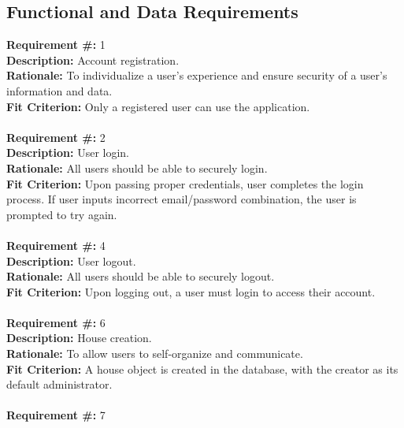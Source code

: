 \documentclass[12pt]{article}
\begin{document}
\subsection{Functional and Data Requirements} \label{functional}
\textbf{Requirement \#:} 1
       \\
      \textbf{Description: }{Account registration.} \\
      \textbf{Rationale: }{To individualize a user's experience and ensure security of a user's information and data.} \\
      \textbf{Fit Criterion: }{Only a registered user can use the application.} \\ \\ 
\textbf{Requirement \#:} 2
       \\
      \textbf{Description: }{User login.} \\
      \textbf{Rationale: }{All users should be able to securely login.} \\
      \textbf{Fit Criterion: }{Upon passing proper credentials, user completes 
the login process. If user inputs incorrect email/password combination, the user is prompted to try again.} \\ \\
\textbf{Requirement \#:} 4
       \\
      \textbf{Description: }{User logout.} \\
      \textbf{Rationale: }{All users should be able to securely logout.} \\
      \textbf{Fit Criterion: }{Upon logging out, a user must login to access their account.} \\ \\
\textbf{Requirement \#:} 6
       \\
      \textbf{Description:} House creation. \\
      \textbf{Rationale:} To allow users to self-organize and communicate. \\
      \textbf{Fit Criterion:} A house object is created in the database, with
      the creator as its default administrator. \\ \\  
\textbf{Requirement \#:} 7
       \\
\end{document}

